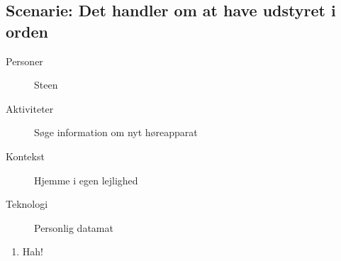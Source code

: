 \subsection{Scenarie: Det handler om at have udstyret i orden}
\begin{description}
    \item[Personer] Steen
    \item[Aktiviteter] Søge information om nyt høreapparat
    \item[Kontekst] Hjemme i egen lejlighed
    \item[Teknologi] Personlig datamat
\end{description}

\begin{enumerate}
    \item Hah!
\end{enumerate}
